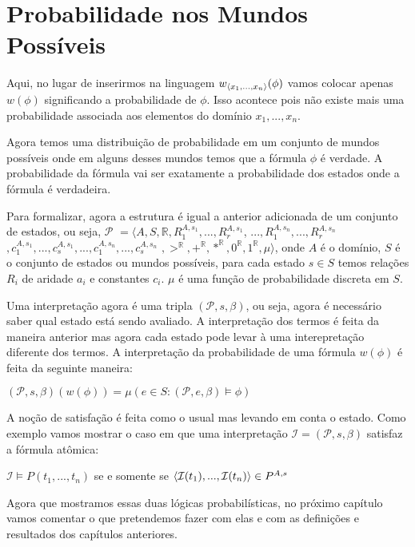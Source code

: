 \section{Probabilidade nos Mundos Possíveis}
Aqui, no lugar de inserirmos na linguagem $w_{\left \langle x_1,..., x_n \right \rangle }(\phi)$ vamos colocar apenas $w(\phi)$ significando a probabilidade de $\phi$. Isso acontece pois não existe mais uma probabilidade associada aos elementos do domínio $x_1,..., x_n$. 

Agora temos uma distribuição de probabilidade em um conjunto de mundos possíveis onde em alguns desses mundos temos que a fórmula $\phi$ é verdade. A probabilidade da fórmula vai ser exatamente a probabilidade dos estados onde a fórmula é verdadeira.

Para formalizar, agora a estrutura é igual a anterior adicionada de um conjunto de estados, ou seja, $\mathcal{P}$ $= \langle A, S, \mathbb{R},  R_{1}^{A,s_1}, ..., R_{r}^{A,s_1}$, $ ..., R_{1}^{A,s_n}, ..., R_{r}^{A,s_n}$ $, c_1^{A, s_1}, ..., c_s^{A, s_1}, ..., c_1^{A, s_n}, ..., c_s^{A, s_n}$ $, >^{\mathbb{R}}, +^{\mathbb{R}}, *^{\mathbb{R}}, 0^{\mathbb{R}}, 1^{\mathbb{R}}, \mu \rangle$, onde $A$ é o domínio, $S$ é o conjunto de estados ou mundos possíveis, para cada estado $s \in S$ temos relações $R_i$ de aridade $a_i$ e constantes $c_i$. $\mu$ é uma função de probabilidade discreta em $S$. 

Uma interpretação agora é uma tripla $(\mathcal{P}, s, \beta)$, ou seja, agora é necessário saber qual estado está sendo avaliado. A interpretação dos termos é feita da maneira anterior mas agora cada estado pode levar à uma interepretação diferente dos termos. A interpretação da probabilidade de uma fórmula $w(\phi)$ é feita da seguinte maneira: 
\begin{center}
$(\mathcal{P}, s, \beta)(w(\phi)) = \mu(e \in S : (\mathcal{P}, e, \beta) \models \phi)$
\end{center}

A noção de satisfação é feita como o usual mas levando em conta o estado. Como exemplo vamos mostrar o caso em que uma interpretação $\mathcal{I} = (\mathcal{P}, s, \beta)$ satisfaz a fórmula atômica:
\begin{center}
$\mathcal{I} \models P(t_1, ..., t_n)$ se e somente se $\left \langle \mathcal{I}(t_1), ..., \mathcal{I}(t_n) \right \rangle  \in P^{A, s}$
\end{center}

Agora que mostramos essas duas lógicas probabilísticas, no próximo capítulo vamos comentar o que pretendemos fazer com elas e com as definições e resultados dos capítulos anteriores.